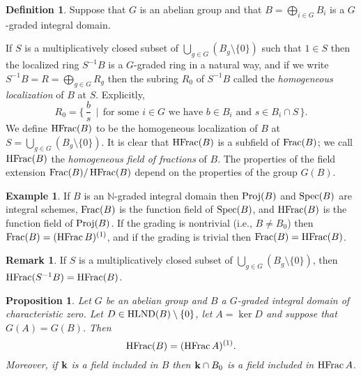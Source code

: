 \documentclass[12pt]{amsart}
\theoremstyle{plain}
\newtheorem{proposition}[subsection]{Proposition}
\theoremstyle{definition}
\newtheorem{definition}[subsection]{Definition}
\newtheorem{example}[subsection]{Example}
\newtheorem{remark}[subsection]{Remark}
\newcommand{\Spec}{		\operatorname{{\rm Spec}}}
\newcommand{\Proj}{		\operatorname{{\rm Proj}}}
\newcommand{\Frac}{		\operatorname{{\rm Frac}}}
\newcommand{\HFrac}{		\operatorname{{\rm HFrac}}}
\newcommand{\setspec}[2]{\big\{\,#1\, \mid \,#2\, \big\}}
\newcommand{\Nat}{\ensuremath{\mathbb{N}}}
\newcommand{\bk}{{\ensuremath{\rm \bf k}}}
\newcommand{\hlnd}{\operatorname{{\rm HLND}}}
\begin{document}
\begin{definition}
Suppose that $G$ is an abelian group and that  $B = \bigoplus_{i \in G} B_i$ is a $G$-graded integral domain.

If $S$ is a multiplicatively closed subset of $\bigcup_{g \in G} ( B_g \setminus \{0\})$ such that $1 \in S$ then the localized ring
$S^{-1}B$ is a $G$-graded ring in a natural way, and if we write $S^{-1}B = R = \bigoplus_{g \in G} R_g$ then
the subring $R_0$ of $S^{-1}B$ called the \textit{homogeneous localization} of $B$ at $S$.
Explicitly,
$$
R_0 = \setspec{ \textstyle \frac bs }{ \text{for some $i \in G$ we have $b \in B_i$ and $s \in B_i \cap S$} } .
$$
We define $\HFrac(B)$ to be the homogeneous localization of $B$ at $S = \bigcup_{g \in G} ( B_g \setminus \{0\})$.
It is clear that $\HFrac(B)$ is a subfield of $\Frac(B)$;
we call $\HFrac(B)$ the \textit{homogeneous field of fractions} of $B$.
The properties of the field extension $\Frac(B) / \HFrac(B)$ depend on the properties of the group $G(B)$.
\end{definition}

\begin{example} \label{HFracExample}
If $B$ is an $\Nat$-graded integral domain then $\Proj(B)$ and $\Spec(B)$ are integral schemes,
$\Frac(B)$ is the function field of $\Spec(B)$, and $\HFrac(B)$ is the function field of $\Proj(B)$.
If the grading is nontrivial (i.e., $B \neq B_0$) then $\Frac(B) = (\HFrac B)^{(1)}$,
and if the grading is trivial then $\Frac(B) = \HFrac(B)$.
\end{example}

\begin{remark} \label{hfracLoc}
	If $S$ is a multiplicatively closed subset of $\bigcup_{g \in G} ( B_g \setminus \{0\})$, then $\HFrac(S^{-1}B) = \HFrac(B)$. 
\end{remark}

\begin{proposition} \label {mainResultGeneralized}
Let $G$ be an abelian group and $B$ a $G$-graded integral domain of characteristic zero.
Let $D \in \hlnd(B) \setminus \{0\}$, let $A = \ker D$ and suppose that $G(A) = G(B)$.
Then 
$$
\HFrac(B) = (\HFrac A)^{(1)}.
$$
Moreover, if $\bk$ is a field included in $B$ then $\bk \cap B_0$ is a field included in $\HFrac A$.
\end{proposition}
\end{document}
